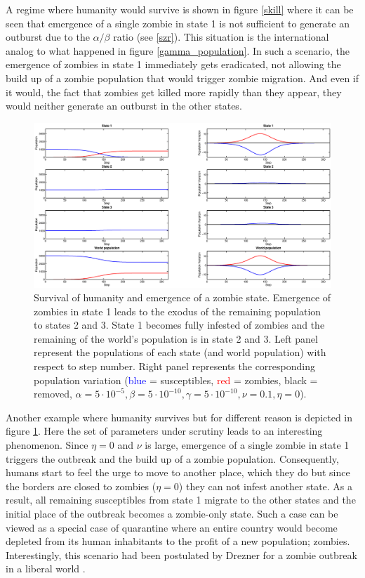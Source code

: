 \documentclass[11pt]{article} %
\begin{document}
A regime where humanity would survive is shown in figure \ref{skill} where it can be seen that emergence of a single zombie in state 1 is not sufficient to generate an outburst due to the $\alpha/\beta$ ratio (see \ref{szr}). This situation is the international analog to what happened in figure \ref{gamma_population}. In such a scenario, the emergence of zombies in state 1 immediately gets eradicated, not allowing the build up of a zombie population that would trigger zombie migration. And even if it would, the fact that zombies get killed more rapidly than they appear, they would neither generate an outburst in the other states.




\begin{figure}[h!]
\centerline{
\includegraphics[scale=0.35]{../images/Matlab_figures/example_exode.eps}}
\caption{Survival of humanity and emergence of a zombie state. Emergence of zombies in state 1 leads to the exodus of the remaining population to states 2 and 3. State 1 becomes fully infested of zombies and the remaining of the world's population is in state 2 and 3. Left panel represent the populations of each state (and world population) with respect to step number. Right panel represents the corresponding population variation (\textcolor{blue}{blue} = susceptibles, \textcolor{red}{red} = zombies, black = removed, $\alpha=5\cdot10^{-5},  \beta=5\cdot10^{-10},  \gamma=5\cdot10^{-10},  \nu=0.1,  \eta=0$). \label{exodus} }
\end{figure}

Another example where humanity survives but for different reason is depicted in figure \ref{exodus}.
Here the set of parameters under scrutiny leads to an interesting phenomenon. Since $\eta=0$ and $\nu$ is large, emergence of a single zombie in state 1 triggers the outbreak and the build up of a zombie population. Consequently, humans start to feel the urge to move to another place, which they do but since the borders are closed to zombies ($\eta=0$) they can not infest another state. As a result, all remaining susceptibles from state 1 migrate to the other states and the initial place of the outbreak becomes a zombie-only state. Such a case can be viewed as a special case of quarantine where an entire country would become depleted from its human inhabitants to the profit of a new population; zombies. Interestingly, this scenario had been postulated by Drezner for a zombie outbreak in a liberal world \cite{drezner}. 
\end{document}
